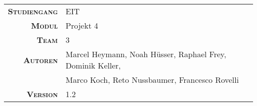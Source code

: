 \begin{titlepage}

    \maketitle

    \vspace{60mm}

    \begin{tabular}{r|l}

        \textsc{\textbf{Studiengang}}
        & EIT\\
        [4mm]

        \textsc{\textbf{Modul}}
        & Projekt 4 \\
        [4mm]

        \textsc{\textbf{Team}}
        & 3 \\
        [4mm]

        \textsc{\textbf{Autoren}}
        & Marcel Heymann, Noah H\"usser, Raphael Frey, Dominik Keller,  \\
        & Marco Koch, Reto Nussbaumer, Francesco Rovelli                \\
        [4mm]

        \textsc{\textbf{Version}}
        & 1.2 \\
    \end{tabular}

\end{titlepage}
